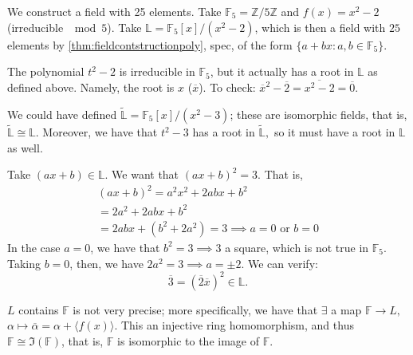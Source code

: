 \documentclass[12pt,oneside]{article}
\begin{document}


\begin{example}
  We construct a field with 25 elements. Take $\mathbb{F}_5 = \mathbb{Z}/5\mathbb{Z}$ and $f(x) = x^2-2$ (irreducible $\mod 5$). Take $\mathbb{L} = \mathbb{F}_5[x]/(x^2 - 2)$, which is then a field with $25$ elements by \cref{thm:fieldcontstructionpoly}, spec, of the form $\{a + bx: a, b \in \mathbb{F}_5\}$.
\end{example}

\begin{remark}
  The polynomial $t^2 -2$ is irreducible in $\mathbb{F}_5$, but it actually has a root in $\mathbb{L}$ as defined above. Namely, the root is $x$ ($\overline{x}$). To check: $\overline{x}^2 - \overline{2} = \overline{x^2 - 2} = \overline{0}$.\footnotemark
\end{remark}


\begin{remark}
  We could have defined $\tilde{\mathbb{L}} = \mathbb{F}_5[x]/(x^2 - 3)$; these are isomorphic fields, that is, $\tilde{\mathbb{L}}\cong \mathbb{L}$. Moreover, we have that $t^2 - 3$ has a root in $\tilde{\mathbb{L}},$ so it must have a root in $\mathbb{L}$ as well.

  Take $(ax + b) \in \mathbb{L}$. We want that $(ax+b)^2  =3$. That is,
  \begin{align*}
    (ax+b)^2 = a^2 x^2 + 2abx + b^2\\
    = 2a^2 + 2abx + b^2 \\
    = 2abx + (b^2 + 2a^2) = 3 \implies a = 0 \text{ or } b = 0
  \end{align*}
  In the case $a = 0$, we have that $b^2 = 3 \implies 3$ a square, which is not true in $\mathbb{F}_5$. Taking $b = 0$, then, we have $2a^2 = 3 \implies a = \pm 2$. We can verify:
  \[
  \overline{3} = (\overline{2} \overline{x})^2 \in \mathbb{L}.
  \]
\end{remark}

\begin{remark}
  $L$ contains $\mathbb{F}$ is not very precise; more specifically, we have that $\exists$ a map $\mathbb{F} \to L,$ $\alpha \mapsto \overline{\alpha} = \alpha + \langle f(x) \rangle$. This an injective ring homomorphism, and thus $\mathbb{F} \cong \Im(\mathbb{F})$, that is, $\mathbb{F}$ is isomorphic to the image of $\mathbb{F}$.
\end{remark}
\end{document}
